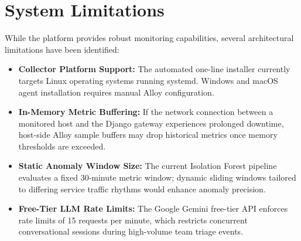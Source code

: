 \section{System Limitations}
While the platform provides robust monitoring capabilities, several architectural limitations have been identified:
\begin{itemize}
  \item \textbf{Collector Platform Support:} The automated one-line installer currently targets Linux operating systems running systemd. Windows and macOS agent installation requires manual Alloy configuration.
  \item \textbf{In-Memory Metric Buffering:} If the network connection between a monitored host and the Django gateway experiences prolonged downtime, host-side Alloy sample buffers may drop historical metrics once memory thresholds are exceeded.
  \item \textbf{Static Anomaly Window Size:} The current Isolation Forest pipeline evaluates a fixed 30-minute metric window; dynamic sliding windows tailored to differing service traffic rhythms would enhance anomaly precision.
  \item \textbf{Free-Tier LLM Rate Limits:} The Google Gemini free-tier API enforces rate limits of 15 requests per minute, which restricts concurrent conversational sessions during high-volume team triage events.
\end{itemize}

